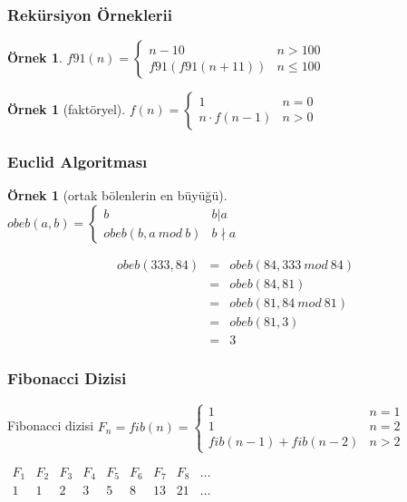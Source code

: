 \documentclass[dvipsnames]{beamer}
\theoremstyle{definition}
\theoremstyle{example}
\newtheorem{ornek}[theorem]{Örnek}
\theoremstyle{plain}
\begin{document}
\begin{frame}
  \frametitle{Rekürsiyon Örneklerii}

  \begin{ornek}
    $f91(n) = \left\{
      \begin{array}{ll}
        n - 10         & n > 100\\
        f91(f91(n+11)) & n \leq 100
      \end{array}
    \right.$
  \end{ornek}

  \pause
  \medskip
  \begin{ornek}[faktöryel]
    $f(n) = \left\{
      \begin{array}{ll}
        1              & n = 0\\
        n \cdot f(n-1) & n > 0
      \end{array}
    \right.$
  \end{ornek}
\end{frame}

\begin{frame}
  \frametitle{Euclid Algoritması}

  \begin{ornek}[ortak bölenlerin en büyüğü]
    $obeb(a,b) = \left\{
      \begin{array}{ll}
        b               & b | a\\
        obeb(b,a~mod~b) & b \nmid a
      \end{array}
    \right.$

    \pause
    \medskip
    \begin{eqnarray*}
      obeb(333,84) & = & obeb(84, 333~mod~84)\\
                   & = & obeb(84, 81)\\
                   & = & obeb(81, 84~mod~81)\\
                   & = & obeb(81, 3)\\
                   & = & 3
    \end{eqnarray*}
  \end{ornek}
\end{frame}

\begin{frame}
  \frametitle{Fibonacci Dizisi}

  \begin{block}{Fibonacci dizisi}
    $F_n = fib(n) = \left\{
      \begin{array}{ll}
        1                   & n = 1\\
        1                   & n = 2\\
        fib(n-1) + fib(n-2) & n > 2
      \end{array}
    \right.$
  \end{block}

  \bigskip
  $\begin{array}{ccccccccc}
     F_1 & F_2 & F_3 & F_4 & F_5 & F_6 & F_7 & F_8 & \dots\\
     1   & 1   & 2   & 3   & 5   & 8   & 13  & 21  & \dots
  \end{array}$
\end{frame}
\end{document}
